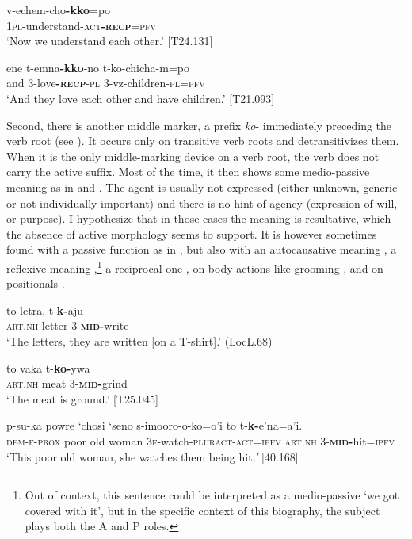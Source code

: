\documentclass[output=paper]{langscibook}
\begin{document}
\ea
\label{ex:Rose:49}
\gll v-echem-cho\textbf{-kko}=po \\
1\textsc{pl}-understand-\textsc{act\textbf{-recp}=pfv}\\
\glt ‘Now we understand each other.’ [T24.131]
\z

\ea
\label{ex:Rose:50}
\gll ene t-emna\textbf{-kko}-no t-ko-chicha-m=po\\
and 3-love\textbf{-}\textsc{\textbf{recp}-pl} 3-vz-children-\textsc{pl=pfv}\\
\glt ‘And they love each other and have children.’ [T21.093]
\z


Second, there is another middle marker, a prefix \textit{ko}- immediately preceding the verb root (see ). It occurs only on transitive verb roots and detransitivizes them. When it is the only middle-marking device on a verb root, the verb does not carry the active suffix. Most of the time, it then shows some medio-passive meaning as in  and . The agent is usually not expressed (either unknown, generic or not individually important) and there is no hint of agency (expression of will, or purpose). I hypothesize that in those cases the meaning is resultative, which the absence of active morphology seems to support. It is however sometimes found with a passive function as in , but also with an autocausative meaning , a reflexive meaning ,\footnote{Out of context, this sentence could be interpreted as a medio-passive ‘we got covered with it’, but in the specific context of this biography, the subject plays both the A and P roles.} a reciprocal one , on body actions like grooming , and on positionals .


\ea
\label{ex:Rose:51}
\gll to letra, t-\textbf{k-}aju\\
\textsc{art.nh} letter 3-\textsc{\textbf{mid}}\textbf{-}write\\
\glt ‘The letters, they are written [on a T-shirt].’ (LocL.68)
\z

\ea
\label{ex:Rose:52}
\gll to vaka t-\textbf{ko-}ywa \\
\textsc{art}.\textsc{nh} meat 3-\textbf{\textsc{mid}}\textbf{-}grind\\
\glt ‘The meat is ground.’ [T25.045]
\z

\ea
\label{ex:Rose:53}
\gll p-su-ka powre `chosi `seno s-imooro-o-ko=o'i to t-\textbf{k-}e'na=a'i.\\
\textsc{dem-f-prox} poor old woman 3\textsc{f}-watch-\textsc{pluract-act=ipfv} \textsc{art.nh} \textsc{3-\textbf{mid}}\textbf{-}hit=\textsc{ipfv}\\
\glt ‘This poor old woman, she watches them being hit\textit{.’} [40.168]
\z
\end{document}

